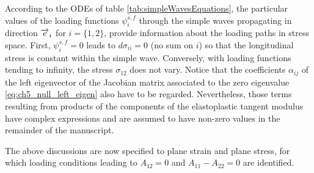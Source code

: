 According to the ODEs of table \ref{tab:simpleWavesEquations}, the particular values of the loading functions $\psi_i^{s,f}$ through the simple waves propagating in direction ${\overrightarrow{e}}_i$ for $i=\{1,2\}$, provide information about the loading paths in stress space.
First, $\psi^{s,f}_i =0$ leads to $d\sigma_{ii}=0$ (no sum on $i$) so that the longitudinal stress is constant within the simple wave.
Conversely, with loading functions tending to infinity, the stress $\sigma_{12}$ does not vary.
Notice that the coefficients $\alpha_{ij}$ of the left eigenvector of the Jacobian matrix associated to the zero eigenvalue \eqref{eq:ch5_null_left_eigen} also have to be regarded.
Nevertheless, those terms resulting from products of the components of the elastoplastic tangent modulus have complex expressions and are assumed to have non-zero values in the remainder of the manuscript.

The above discussions are now specified to plane strain and plane stress, for which loading conditions leading to $A_{12} =0$ and $A _{11}-A _{22}=0$ are identified.



